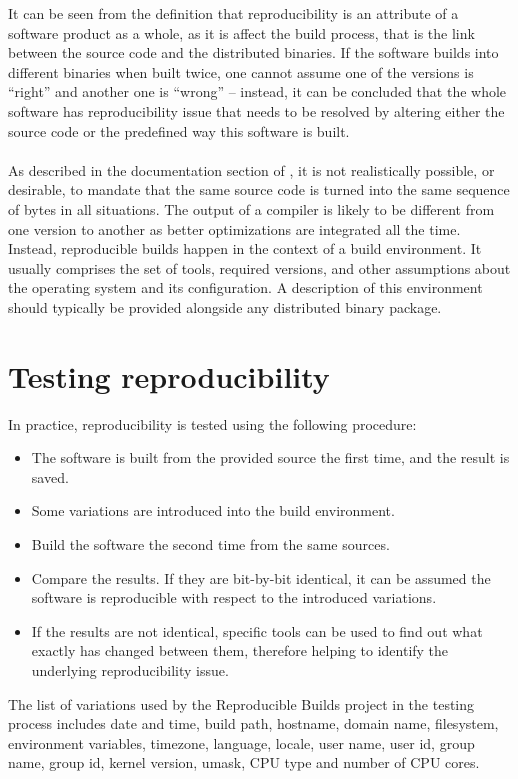 {It can be seen from the definition that reproducibility is an attribute of a software product as a whole, as it is affect the build process, that is the link between the source code and the distributed binaries. If the software builds into different binaries when built twice, one cannot assume one of the versions is ``right'' and another one is ``wrong'' -- instead, it can be concluded that the whole software has reproducibility issue that needs to be resolved by altering either the source code or the predefined way this software is built.\\\\

As described in the documentation section of \autocite{rb}, it is not realistically possible, or desirable, to mandate that the same source code is turned into the same sequence of bytes in all situations. The output of a compiler is likely to be different from one version to another as better optimizations are integrated all the time. 
Instead, reproducible builds happen in the context of a build environment. It usually comprises the set of tools, required versions, and other assumptions about the operating system and its configuration. A description of this environment should typically be provided alongside any distributed binary package.
}
\section[Testing reproducibility]{Testing reproducibility}
In practice, reproducibility is tested using the following procedure:
\begin{itemize}
    \item The software is built from the provided source the first time, and the result is saved.
    \item Some variations are introduced into the build environment.
    \item Build the software the second time from the same sources.
    \item Compare the results. If they are bit-by-bit identical, it can be assumed the software is reproducible with respect to the introduced variations.
    \item If the results are not identical, specific tools can be used to find out what exactly has changed between them, therefore helping to identify the underlying reproducibility issue.
\end{itemize}

The list of variations used by the Reproducible Builds project in the testing process includes 
    date and time,
    build path,
    hostname,
    domain name,
    filesystem,
    environment variables,
    timezone,
    language,
    locale,
    user name,
    user id,
    group name,
    group id,
    kernel version,
    umask,
    CPU type and number of CPU cores.


